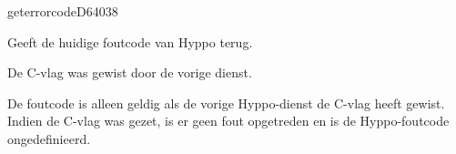 \begin{hyppotrap}{geterrorcode}{D640}{38}

\item [Dienst:]  Geeft de huidige foutcode van Hyppo terug.
\item [Voorbeding:]  De C-vlag was gewist door de vorige dienst.
\item [Resultaat:]  
\item [Geschiedenis:]
\item [Opmerkingen:]  De foutcode is alleen geldig als de vorige Hyppo-dienst de C-vlag heeft gewist.  Indien de C-vlag was gezet, is er geen fout opgetreden en is de Hyppo-foutcode  ongedefinieerd.


\end{hyppotrap}
